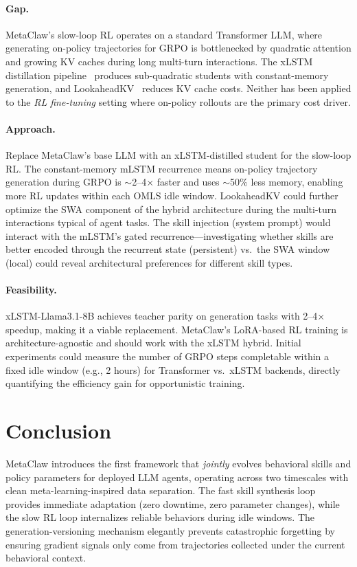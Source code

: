 \documentclass[11pt]{article}
\begin{document}
\paragraph{Gap.}
MetaClaw's slow-loop RL operates on a standard Transformer LLM, where generating on-policy trajectories for GRPO is bottlenecked by quadratic attention and growing KV caches during long multi-turn interactions.
The xLSTM distillation pipeline~\cite{xlstm-distill} produces sub-quadratic students with constant-memory generation, and LookaheadKV~\cite{lookaheadkv} reduces KV cache costs.
Neither has been applied to the \emph{RL fine-tuning} setting where on-policy rollouts are the primary cost driver.

\paragraph{Approach.}
Replace MetaClaw's base LLM with an xLSTM-distilled student for the slow-loop RL.
The constant-memory mLSTM recurrence means on-policy trajectory generation during GRPO is $\sim$2--4$\times$ faster and uses $\sim$50\% less memory, enabling more RL updates within each OMLS idle window.
LookaheadKV could further optimize the SWA component of the hybrid architecture during the multi-turn interactions typical of agent tasks.
The skill injection (system prompt) would interact with the mLSTM's gated recurrence---investigating whether skills are better encoded through the recurrent state (persistent) vs.\ the SWA window (local) could reveal architectural preferences for different skill types.

\paragraph{Feasibility.}
xLSTM-Llama3.1-8B achieves teacher parity on generation tasks with 2--4$\times$ speedup, making it a viable replacement.
MetaClaw's LoRA-based RL training is architecture-agnostic and should work with the xLSTM hybrid.
Initial experiments could measure the number of GRPO steps completable within a fixed idle window (e.g., 2 hours) for Transformer vs.\ xLSTM backends, directly quantifying the efficiency gain for opportunistic training.

\section{Conclusion}

MetaClaw introduces the first framework that \emph{jointly} evolves behavioral skills and policy parameters for deployed LLM agents, operating across two timescales with clean meta-learning-inspired data separation.
The fast skill synthesis loop provides immediate adaptation (zero downtime, zero parameter changes), while the slow RL loop internalizes reliable behaviors during idle windows.
The generation-versioning mechanism elegantly prevents catastrophic forgetting by ensuring gradient signals only come from trajectories collected under the current behavioral context.
\end{document}
